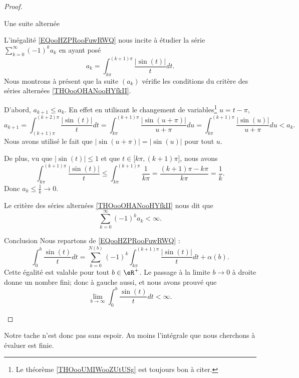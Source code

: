\begin{proof}
\begin{subproof}
        \item[Une suite alternée]

            L'inégalité \eqref{EQooHZPRooFuwRWQ} nous incite à étudier la série \( \sum_{k=0}^{\infty}(-1)^ka_k\) en ayant posé
            \begin{equation}
                a_k=\int_{k\pi}^{(k+1)\pi}\frac{ | \sin(t) | }{ t }dt.
            \end{equation}
            Nous montrons à présent que la suite \( (a_k)\) vérifie les conditions du critère des séries alternées \ref{THOooOHANooHYfkII}.

            D'abord, \( a_{k+1}\leq a_k\). En effet en utilisant le changement de variables\footnote{Le théorème \ref{THOooUMIWooZUtUSg} est toujours bon à citer.} \( u=t-\pi\),
            \begin{equation}
                a_{k+1}=\int_{(k+1)\pi}^{(k+2)\pi}\frac{ | \sin(t) | }{ t }dt=\int_{k\pi}^{(k+1)\pi}\frac{ | \sin(u+\pi) | }{ u+\pi }du=\int_{k\pi}^{(k+1)\pi}\frac{ | \sin(u) | }{ u+\pi }du<a_k.
            \end{equation}
            Nous avons utilisé le fait que \( | \sin(u+\pi) |=| \sin(u) |\) pour tout \( u\).

            De plus, vu que \( | \sin(t) |\leq 1\) et que \( t\in\mathopen[ k\pi , (k+1)\pi \mathclose]\), nous avons
            \begin{equation}
                \int_{k\pi}^{(k+1)\pi}\frac{ | \sin(t) | }{ t }\leq \int_{k\pi}^{(k+1)\pi}\frac{1}{ k\pi }=\frac{ (k+1)\pi-k\pi }{ k\pi }=\frac{1}{ k }.
            \end{equation}
            Donc \( a_k\leq\frac{1}{ k }\to 0\).

            Le critère des séries alternées \ref{THOooOHANooHYfkII} nous dit que
            \begin{equation}
                \sum_{k=0}^{\infty}(-1)^ka_k<\infty.
            \end{equation}

        \item[Conclusion]
            Nous repartons de \eqref{EQooHZPRooFuwRWQ} :
            \begin{equation} 
                \int_0^b\frac{ \sin(t) }{ t }dt=\sum_{k=0}^{N(b)}(-1)^k\int_{k\pi}^{(k+1)\pi}\frac{ | \sin(t) | }{ t }dt+\alpha(b).
            \end{equation}
            Cette égalité est valable pour tout \( b\in \eR^+\). Le passage à la limite \( b\to 0\) à droite donne un nombre fini; donc à gauche aussi, et nous avons prouvé que
            \begin{equation}
                \lim_{b\to\infty} \int_0^b\frac{ \sin(t) }{ t }dt<\infty.
            \end{equation}
    \end{subproof}
\end{proof}
Notre tache n'est donc pas sans espoir. Au moins l'intégrale que nous cherchons à évaluer est finie.

